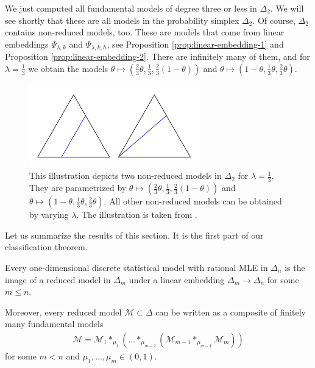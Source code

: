 \begin{example}
We just computed all fundamental models of degree three or less in \( \Delta_2 \). We will see shortly that these are all models in the probability simplex \( \Delta_2 \). Of course, \( \Delta_2 \) contains non-reduced models, too. These are models that come from linear embeddings \( \Psi_{\lambda,k} \) and \( \Psi_{\lambda,k,h} \), see Proposition \ref{prop:linear-embedding-1} and Proposition \ref{prop:linear-embedding-2}. There are infinitely many of them, and for \( \lambda = \frac{1}{3} \) we obtain the models \( \theta \mapsto (\frac{2}{3}\theta, \frac{1}{3}, \frac{2}{3}(1 - \theta)) \) and \( \theta \mapsto (1-\theta, \frac{1}{3}\theta, \frac{2}{3}\theta) \).

\begin{figure}[H]
    \centering
    \includegraphics[width=0.66\textwidth]{assets/non-red-models-delta-2.png}
    \caption{This illustration depicts two non-reduced models in \( \Delta_2 \) for \( \lambda = \frac{1}{3} \). They are parametrized by \( \theta \mapsto (\frac{2}{3}\theta, \frac{1}{3}, \frac{2}{3}(1 - \theta)) \) and \( \theta \mapsto (1-\theta, \frac{1}{3}\theta, \frac{2}{3}\theta) \). All other non-reduced models can be obtained by varying \( \lambda \). The illustration is taken from \cite{bik2022classifying}.} 
\end{figure}
\end{example}

Let us summarize the results of this section. It is the first part of our classification theorem.

\begin{theorem}
    Every one-dimensional discrete statistical model with rational MLE in \( \Delta_n \) is the image of a reduced model in \( \Delta_m \) under a linear embedding \( \Delta_m \to \Delta_n \) for some \( m \leq n \).

    Moreover, every reduced model \( \mathcal{M} \subset \Delta \) can be written as a composite of finitely many fundamental models
    \begin{align*}
        \mathcal{M} = \mathcal{M}_1 *_{\mu_1} ( \dots *_{\mu_{m-2}}( \mathcal{M}_{m-1} *_{\mu_{m-1}} \mathcal{M}_m) )
    \end{align*}
    for some \( m < n \) and \( \mu_1, \dots, \mu_m \in (0,1) \).
\end{theorem}


